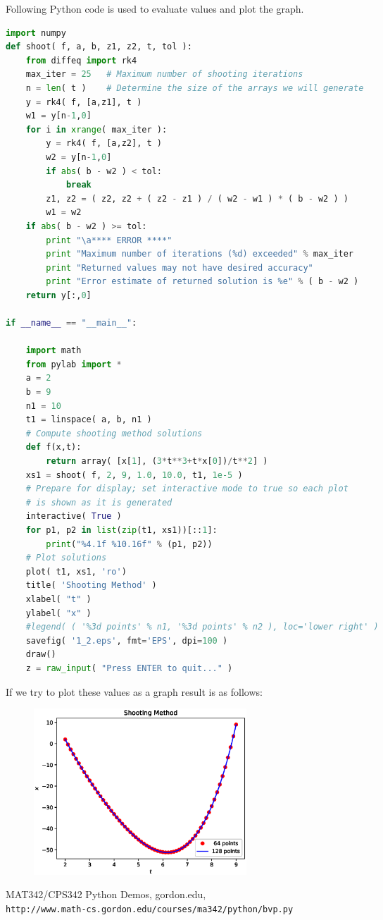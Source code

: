 \documentclass[a4paper,10pt]{article}
\begin{document}
Following Python code \cite{gordon} is used to evaluate values and plot the graph.
\begin{lstlisting}[language=Python]
import numpy
def shoot( f, a, b, z1, z2, t, tol ):
    from diffeq import rk4
    max_iter = 25   # Maximum number of shooting iterations
    n = len( t )    # Determine the size of the arrays we will generate
    y = rk4( f, [a,z1], t )
    w1 = y[n-1,0]
    for i in xrange( max_iter ):
        y = rk4( f, [a,z2], t )
        w2 = y[n-1,0]
        if abs( b - w2 ) < tol:
            break
        z1, z2 = ( z2, z2 + ( z2 - z1 ) / ( w2 - w1 ) * ( b - w2 ) )
        w1 = w2
    if abs( b - w2 ) >= tol:
        print "\a**** ERROR ****"
        print "Maximum number of iterations (%d) exceeded" % max_iter
        print "Returned values may not have desired accuracy"
        print "Error estimate of returned solution is %e" % ( b - w2 )
    return y[:,0]

if __name__ == "__main__":

    import math
    from pylab import *
    a = 2
    b = 9
    n1 = 10
    t1 = linspace( a, b, n1 )
    # Compute shooting method solutions
    def f(x,t):
        return array( [x[1], (3*t**3+t*x[0])/t**2] )
    xs1 = shoot( f, 2, 9, 1.0, 10.0, t1, 1e-5 )
    # Prepare for display; set interactive mode to true so each plot
    # is shown as it is generated
    interactive( True )
    for p1, p2 in list(zip(t1, xs1))[::1]:
    	print("%4.1f %10.16f" % (p1, p2))
    # Plot solutions
    plot( t1, xs1, 'ro')
    title( 'Shooting Method' )
    xlabel( "t" )
    ylabel( "x" )
    #legend( ( '%3d points' % n1, '%3d points' % n2 ), loc='lower right' )
    savefig( '1_2.eps', fmt='EPS', dpi=100 )
    draw()
    z = raw_input( "Press ENTER to quit..." )
\end{lstlisting}
If we try to plot these values as a graph result is as follows:
\begin{figure}[ht]
\includegraphics[width=8cm]{1_2.eps}
\end{figure}

\medskip

\begin{thebibliography}{9}
 MAT342/CPS342 Python Demos, gordon.edu, \\\texttt{http://www.math-cs.gordon.edu/courses/ma342/python/bvp.py}
\end{thebibliography}
\end{document}

